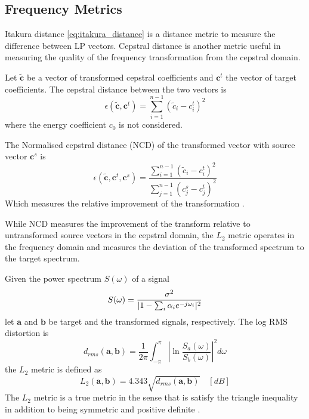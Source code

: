 \subsection{Frequency Metrics} %
\label{sub:frequency_metrics}
Itakura distance \eqref{eq:itakura_distance} is a distance metric to measure the difference between LP vectors. Cepstral distance is another metric useful in measuring the quality of the frequency transformation from the cepstral domain. 
\begin{definition}
	Let $\tilde{\mathbf{c}}$ be a vector of transformed cepstral coefficients and $\mathbf{c}^t$ the vector of target coefficients. The cepstral distance between the two vectors is
	\begin{equation}
		\label{eq:cepstral_distance}
		\epsilon(\tilde{\mathbf{c}},\mathbf{c}^t) = \sum_{i=1}^{n-1}(\tilde{c}_{i}-c_{i}^t)^2
	\end{equation}
	where the energy coefficient $c_0$ is not considered.
	
	The Normalised cepstral distance (NCD) of the transformed vector with source vector $\mathbf{c}^s$ is
	\begin{equation}
		\label{eq:ncd}
		\epsilon(\tilde{\mathbf{c}},\mathbf{c}^t,\mathbf{c}^s) = \frac{{\sum}_{i=1}^{n-1}(\tilde{c}_{i}-c_{i}^t)^2}{\sum_{j=1}^{n-1}(c_{j}^s-c_{j}^t)^2}
	\end{equation}
	Which measures the relative improvement of the transformation \cite{najjary04}.
\end{definition}

While NCD measures the improvement of the transform relative to untransformed source vectors in the cepstral domain, the $L_2$ metric operates in the frequency domain and measures the deviation of the transformed spectrum to the target spectrum.

\begin{definition}
	Given the power spectrum $S(\omega)$ of a signal
\begin{equation}
	S(\omega) = \frac{\sigma^2}{\lvert1-\sum_{i}\alpha_i e^{-j\omega_i}\rvert^2}
\end{equation}
let $\mathbf{a}$ and $\mathbf{b}$ be target and the transformed signals, respectively. The log RMS distortion is
\begin{equation}
	d_{rms}(\mathbf{a},\mathbf{b}) = \frac{1}{2\pi}\int_{-\pi}^{\pi}\left\lvert\ln \frac{S_a(\omega)}{S_b(\omega)}\right\rvert^2 d\omega
\end{equation}
the $L_2$ metric is defined as \cite{gray76}
\begin{equation}
	\label{eq:l2_metric}
	L_2(\mathbf{a},\mathbf{b})  = 4.343 \sqrt{d_{rms}(\mathbf{a},\mathbf{b})} \quad [dB]
\end{equation}
The $L_2$ metric is a true metric in the sense that is satisfy the triangle inequality in addition to being symmetric and positive definite \cite{kreyszig89}.
\end{definition}

